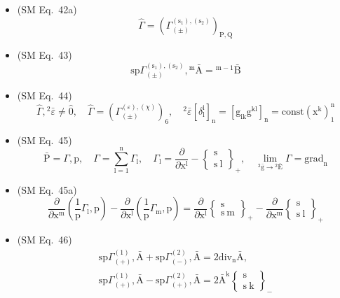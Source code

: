 \documentclass[12pt]{article}
\begin{document}
\begin{itemize}[label={},leftmargin=0pt]
    \item (SM Eq.\ 42a) 
    \[
    \widehat{\Gamma} = \left( \Gamma^{(\mathrm{s}_1), (\mathrm{s}_2)}_{(\pm)} \right)_{\mathrm{P,Q}}
    \]

    \item (SM Eq.\ 43) 
    \[
    \mathrm{sp} \Gamma^{(\mathrm{s}_1), (\mathrm{s}_2)}_{(\pm)}, {}^\mathrm{m}\bar{\mathrm{A}} = {}^{\mathrm{m}-1}\bar{\mathrm{B}}
    \]

    \item (SM Eq.\ 44) 
    \[
    \widehat{\Gamma}, {}^2\bar{\varepsilon} \ne \hat{0}, \quad \widehat{\Gamma} = \left( \Gamma^{(\varepsilon), (\chi)}_{(\pm)} \right)_6, \quad {}^2\bar{\varepsilon} \left[ \delta_\mathrm{l}^\mathrm{i} \right]_\mathrm{n} = \left[ \mathrm{g}_{\mathrm{ik}}\mathrm{g}^{\mathrm{kl}} \right]_\mathrm{n} = \mathrm{const} \left( \mathrm{x^k} \right)_1^\mathrm{n}
    \]

    \item (SM Eq.\ 45) 
    \[
    \bar{\mathrm{P}} = \Gamma, \mathrm{p}, \quad \Gamma = \sum_{\mathrm{l}=1}^\mathrm{n} \Gamma_\mathrm{l}, \quad \Gamma_\mathrm{l} = \frac{\partial}{\partial \mathrm{x^l}} - \left\{ \begin{smallmatrix} \mathrm{s} \\ \mathrm{s\ l} \end{smallmatrix} \right\}_+, \quad \lim_{{}^2\bar{\mathrm{g}} \to {}^2\bar{\mathrm{E}}} \Gamma = \mathrm{grad}_\mathrm{n}
    \]

    \item (SM Eq.\ 45a) 
    \[
    \frac{\partial}{\partial \mathrm{x^m}} \left( \frac{1}{\mathrm{p}} \Gamma_\mathrm{l}, \mathrm{p} \right) - \frac{\partial}{\partial \mathrm{x^l}} \left( \frac{1}{\mathrm{p}} \Gamma_\mathrm{m}, \mathrm{p} \right) = \frac{\partial}{\partial \mathrm{x^l}} \left\{ \begin{smallmatrix} \mathrm{s} \\ \mathrm{s\ m} \end{smallmatrix} \right\}_+ - \frac{\partial}{\partial \mathrm{x^m}} \left\{ \begin{smallmatrix} \mathrm{s} \\ \mathrm{s\ l} \end{smallmatrix} \right\}_+
    \]

    \item (SM Eq.\ 46) 
    \[
    \begin{gathered}
    \mathrm{sp} \Gamma^{(1)}_{(+)}, \bar{\mathrm{A}} + \mathrm{sp} \Gamma^{(2)}_{(-)}, \bar{\mathrm{A}} = 2 \mathrm{div}_\mathrm{n} \bar{\mathrm{A}}, \\
    \mathrm{sp} \Gamma^{(1)}_{(+)}, \bar{\mathrm{A}} - \mathrm{sp} \Gamma^{(2)}_{(+)}, \bar{\mathrm{A}} = 2 \bar{\mathrm{A}}^\mathrm{k} \left\{ \begin{smallmatrix} \mathrm{s} \\ \mathrm{s\ k} \end{smallmatrix} \right\}_-
    \end{gathered}
    \]


\end{itemize}
\end{document}
